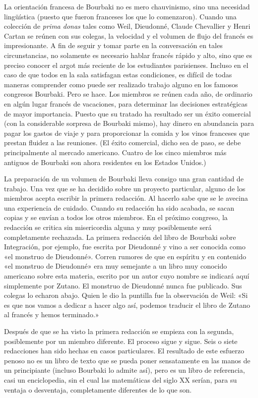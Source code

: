 \documentclass[a4paper, 12pt]{article}
\begin{document}
La orientación francesa de Bourbaki no es mero chauvinismo, sino 
una necesidad lingüística (puesto que fueron franceses los que lo 
comenzaron). Cuando una colección de {\it prima donas} tales como Weil, 
Dieudonné, Claude Chevallier y Henri Cartan se reúnen con sus 
colegas, la velocidad y el volumen de flujo del francés es 
impresionante. A fin de seguir y tomar parte en la conversación en tales 
circunstancias, no solamente es necesario hablar francés rápido y 
alto, sino que es preciso conocer el argot más reciente de los 
estudiantes parisienses. Incluso en el caso de que todos en la sala 
satisfagan estas condiciones, es difícil de todas maneras comprender 
como puede ser realizado trabajo alguno en los famosos congresos Bourbaki. 
Pero se hace. Los miembros se reúnen cada año, de ordinario en 
algún lugar francés de vacaciones, para determinar las decisiones 
estratégicas de mayor importancia. Puesto que su tratado ha resultado 
ser un éxito comercial (con la considerable sorpresa de Bourbaki mismo), 
hay dinero en abundancia para pagar los gastos de viaje y para proporcionar 
la comida y los vinos franceses que prestan fluidez a las reuniones. (El 
éxito comercial, dicho sea de paso, se debe principalmente al mercado 
americano. Cuatro de los cinco miembros más antiguos de Bourbaki son 
ahora residentes en los Estados Unidos.) 

La preparación de un volumen de Bourbaki lleva consigo una gran 
cantidad de trabajo. Una vez que se ha decidido sobre un proyecto 
particular, alguno de los miembros acepta escribir la primera redacción. 
Al hacerlo sabe que se le avecina una experiencia de cuidado. Cuando su 
redacción ha sido acabada, se sacan copias y se envían a todos los 
otros miembros. En el próximo congreso, la redacción se critica sin 
misericordia alguna y muy posiblemente será completamente rechazada. La 
primera redacción del libro de Bourbaki sobre Integración, por 
ejemplo, fue escrita por Dieudonné y vino a ser conocida como «el 
monstruo de Dieudonné». Corren rumores de que en espíritu y en 
contenido  «el monstruo de Dieudonné» era muy semejante a un libro 
muy conocido americano sobre esta materia, escrito por un autor cuyo nombre 
se indicará aquí simplemente por Zutano. El monstruo de 
Dieudonné nunca fue publicado. Sus colegas lo echaron abajo. Quien le 
dio la puntilla fue la observación de Weil: «Si es que nos vamos a 
dedicar a hacer algo así, podemos traducir el libro de Zutano al 
francés y hemos terminado.» 

Después de que se ha visto la primera redacción se empieza con 
la segunda, posiblemente por un miembro diferente. El proceso sigue y sigue. 
Seis o siete redacciones han sido hechas en casos particulares. El resultado 
de este esfuerzo penoso no es un libro de texto que se pueda poner 
sensatamente en las manos de un principiante (incluso Bourbaki lo admite 
así), pero es un libro de referencia, casi un enciclopedia, sin el cual 
las matemáticas del siglo XX serían, para su ventaja o desventaja, 
completamente diferentes de lo que son. 
\end{document}
